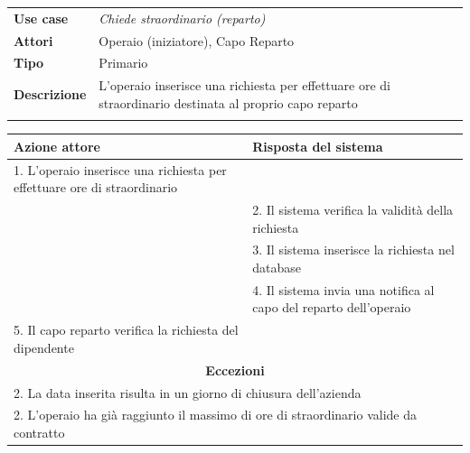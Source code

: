 \documentclass{scrreprt}
\begin{document}
	\FloatBarrier
	\begin{table}[h|]
	\centering
	\begin{tabular}{p{3cm}p{11cm}}
	\textbf{Use case} & \textit{Chiede straordinario (reparto)} \\ 
	\textbf{Attori} & Operaio (iniziatore), Capo Reparto \\ 
	\textbf{Tipo} & Primario \\ 
	\textbf{Descrizione} & L'operaio inserisce una richiesta per effettuare ore di straordinario destinata al proprio capo reparto \\
	\\
	\end{tabular}
	\centering
	\begin{tabular}{|p{7cm}|p{7cm}|}
	\hline
	\textbf{Azione attore} & \textbf{Risposta del sistema} \\ \hline
	1. L'operaio inserisce una richiesta per effettuare ore di straordinario &                  \\ \hline
	& 2. Il sistema verifica la validità della richiesta                  \\ \hline
	& 3. Il sistema inserisce la richiesta nel database                  \\ \hline
	& 4. Il sistema invia una notifica al capo del reparto dell'operaio                  \\ \hline
	5. Il capo reparto verifica la richiesta del dipendente &                   \\ \hline
	\multicolumn{2}{|c|}{\textbf{Eccezioni}} \\ \hline
	\multicolumn{2}{|l|}{ 2. La data inserita risulta in un giorno di chiusura dell'azienda } \\ \hline
	\multicolumn{2}{|l|}{ 2. L'operaio ha già raggiunto il massimo di ore di straordinario valide da contratto } \\ \hline
	\end{tabular}
	\end{table}
	\FloatBarrier

\end{document}
